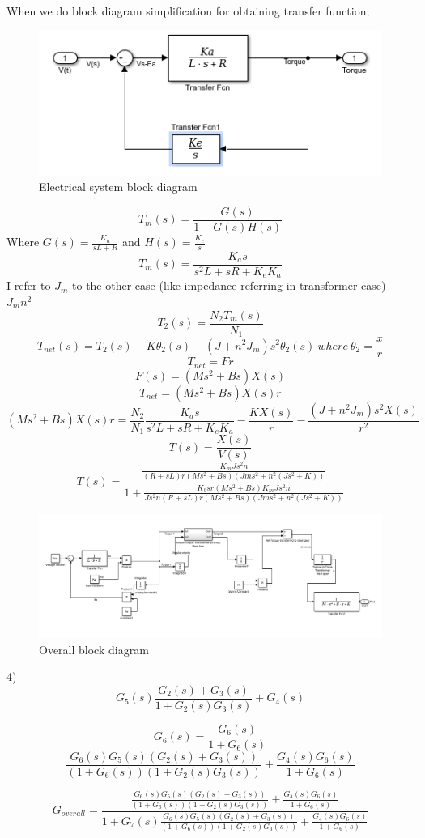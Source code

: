\documentclass[11pt]{article}
\begin{document}
When we do block diagram simplification for obtaining transfer function; 
\begin{figure}[H]
  \includegraphics[width=\linewidth]{elec2}
  \caption{Electrical system block diagram}
  \label{fig:zero}
\end{figure}
\[T_m(s)=\frac{G(s)}{1+G(s)H(s)}\]
Where $G(s)=\frac{K_a}{sL+R}$ and $H(s)=\frac{K_e}{s}$
\[T_m(s)=\frac{K_a s}{s^2L+sR+K_e K_a}\]
I refer to $J_m$ to the other case (like impedance referring in transformer case) $J_m n^2$
\[T_2(s)=\frac{N_2 T_m(s)}{N_1}\]
\[T_{net}(s)=T_2(s)-K\theta_2(s)-(J+n^2J_m)s^2\theta_2(s) \>where \> \theta_2 = \frac{x}{r}\]
\[T_{net}=Fr\]
\[F(s)=(Ms^2+Bs)X(s)\]
\[T_{net}=(Ms^2+Bs)X(s)r\]
\[(Ms^2+Bs)X(s)r=\frac{N_2}{N_1}\frac{K_as}{s^2L+sR+K_e K_a}-\frac{KX(s)}{r}-\frac{(J+n^2J_m)s^2X(s)}{r^2}\]
\[T(s)=\frac{X(s)}{V(s)}\]
\[T(s)=\frac{\frac{K_mJs^2n}{(R+sL)r(Ms^2+Bs)(Jms^2+n^2(Js^2+K))}}{1+\frac{K_bsr(Ms^2+Bs)K_mJs^2n}{Js^2n(R+sL)r(Ms^2+Bs)(Jms^2+n^2(Js^2+K))}}\]

\begin{figure}[H]
  \includegraphics[width=\linewidth]{asd}
  \caption{Overall block diagram}
  \label{fig:zero}
\end{figure}

4)
\[G_5(s)\frac{G_2(s)+G_3(s)}{1+G_2(s)G_3(s)}+G_4(s)\]

\[G_6(s)=\frac{G_6(s)}{1+G_6(s)}\]
\[\frac{G_6(s)G_5(s)(G_2(s)+G_3(s))}{(1+G_6(s))(1+G_2(s)G_3(s))}+\frac{G_4(s)G_6(s)}{1+G_6(s)}\]

\[G_{overall}=\frac{\frac{G_6(s)G_5(s)(G_2(s)+G_3(s))}{(1+G_6(s))(1+G_2(s)G_3(s))}+\frac{G_4(s)G_6(s)}{1+G_6(s)}}{1+G_7(s)\frac{G_6(s)G_5(s)(G_2(s)+G_3(s))}{(1+G_6(s))(1+G_2(s)G_3(s))}+\frac{G_4(s)G_6(s)}{1+G_6(s)}}\]
\end{document}
